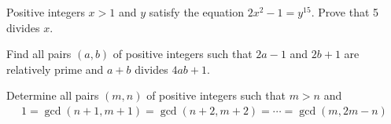 \begin{problem}
	Positive integers $x>1$ and $y$ satisfy the equation $2x^2-1=y^{15}$. Prove that 5 divides $x$. %
\end{problem}


\begin{problem}
	Find all pairs $(a,b)$ of positive integers such that $2a-1$ and $2b+1$ are relatively prime and $a+b$ divides $4ab+1.$ %
\end{problem}




\begin{problem}
	Determine all pairs $(m, n)$ of positive integers such that $m>n$ and
		\begin{align*}
			1 = \gcd(n+1,m+1) = \gcd(n+2,m+2) = \cdots = \gcd(m,2m-n)
		\end{align*}
\end{problem}

